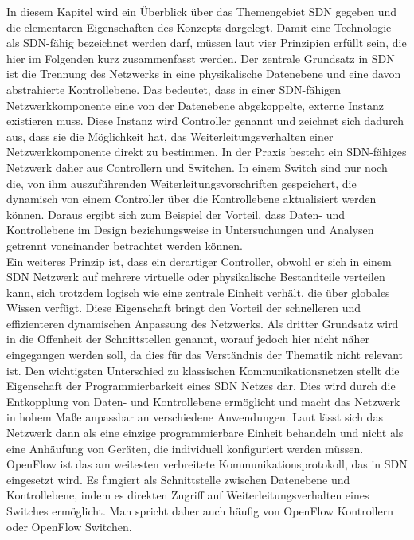\documentclass[conference]{IEEEtran}
\begin{document}
In diesem Kapitel wird ein Überblick über das Themengebiet SDN gegeben und die elementaren Eigenschaften des Konzepts dargelegt. Damit eine Technologie als SDN-fähig bezeichnet werden darf, müssen laut \cite{IEEEhowto:sdn} vier Prinzipien erfüllt sein, die hier im Folgenden kurz zusammenfasst werden. Der zentrale Grundsatz in SDN ist die Trennung des Netzwerks in eine physikalische Datenebene und eine davon abstrahierte Kontrollebene. Das bedeutet, dass in einer SDN-fähigen Netzwerkkomponente eine von der Datenebene abgekoppelte, externe Instanz existieren muss. Diese Instanz wird Controller genannt und zeichnet sich dadurch aus, dass sie die Möglichkeit hat, das Weiterleitungsverhalten einer Netzwerkkomponente direkt zu bestimmen. In der Praxis besteht ein SDN-fähiges Netzwerk daher aus Controllern und Switchen. In einem Switch sind nur noch die, von ihm auszuführenden Weiterleitungsvorschriften gespeichert, die dynamisch von einem Controller über die Kontrollebene aktualisiert werden können. Daraus ergibt sich zum Beispiel der Vorteil, dass Daten- und Kontrollebene im Design beziehungsweise in Untersuchungen und Analysen getrennt voneinander betrachtet werden können. \\
Ein weiteres Prinzip ist, dass ein derartiger Controller, obwohl er sich in einem SDN Netzwerk auf mehrere virtuelle oder physikalische Bestandteile verteilen kann, sich trotzdem logisch wie eine zentrale Einheit verhält, die über globales Wissen verfügt. Diese Eigenschaft bringt den Vorteil der schnelleren und effizienteren dynamischen Anpassung des Netzwerks.
Als dritter Grundsatz wird in \cite{IEEEhowto:sdn} die Offenheit der Schnittstellen genannt, worauf jedoch hier nicht näher eingegangen werden soll, da dies für das Verständnis der Thematik nicht relevant ist. 
Den wichtigsten Unterschied zu klassischen Kommunikationsnetzen stellt die Eigenschaft der Programmierbarkeit eines SDN Netzes dar. Dies wird durch die Entkopplung von Daten- und Kontrollebene ermöglicht und macht das Netzwerk in hohem Maße anpassbar an verschiedene Anwendungen. Laut \cite{IEEEhowto:sdn} lässt sich das Netzwerk dann als eine einzige programmierbare Einheit behandeln und nicht als eine Anhäufung von Geräten, die individuell konfiguriert werden müssen.\\
OpenFlow ist das am weitesten verbreitete Kommunikationsprotokoll, das in SDN eingesetzt wird. Es fungiert als Schnittstelle zwischen Datenebene und Kontrollebene, indem es direkten Zugriff auf Weiterleitungsverhalten eines Switches ermöglicht. Man spricht daher auch häufig von OpenFlow Kontrollern oder OpenFlow Switchen. 
\end{document}
